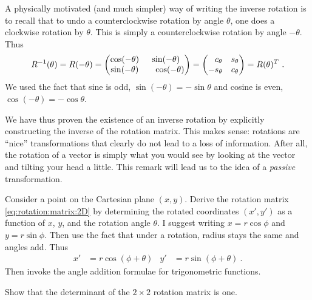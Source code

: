 \documentclass[12pt]{article}
\begin{document}
\begin{example}
A physically motivated (and much simpler) way of writing the inverse rotation is to recall that to undo a counterclockwise rotation by angle $\theta$, one does a clockwise rotation by $\theta$. This is simply a counterclockwise rotation by angle $-\theta$. Thus
\begin{align}
    R\inv(\theta) = R(-\theta)
    =
    \begin{pmatrix}
        \cos(-\theta) & \sin(-\theta) \\
        \sin(-\theta) & \pp \cos(-\theta)
    \end{pmatrix}
    =
    \begin{pmatrix}
        \pp c_\theta &  s_\theta \\
        - s_\theta &  c_\theta
    \end{pmatrix}  
    =
    R(\theta)^T
    \ .
\end{align}
We used the fact that sine is odd, $\sin(-\theta) = -\sin\theta$ and cosine is even, $\cos(-\theta) = -\cos\theta$.
\end{example}

We have thus proven the existence of an inverse rotation by explicitly constructing the inverse of the rotation matrix. This makes sense: rotations are ``nice'' transformations that clearly do not lead to a loss of information. After all, the rotation of a vector is simply what you would see by looking at the vector and tilting your head a little. This remark will lead us to the idea of a \emph{passive} transformation. 

\begin{exercise}
Consider a point on the Cartesian plane $(x,y)$. Derive the rotation matrix \eqref{eq:rotation:matrix:2D} by determining the rotated coordinates $(x',y')$ as a function of $x$, $y$, and the rotation angle $\theta$. I suggest writing $x=r\cos\phi$ and $y=r\sin\phi$. Then use the fact that under a rotation, radius stays the same and angles add. Thus
\begin{align}
     x' &= r\cos(\phi+\theta)
     &
     y' &= r\sin(\phi+\theta) \ .
 \end{align}
Then invoke the angle addition formulae for trigonometric functions. 
\end{exercise}

\begin{exercise}
Show that the determinant of the $2\times 2$ rotation matrix is one.
\end{exercise}
\end{document}

